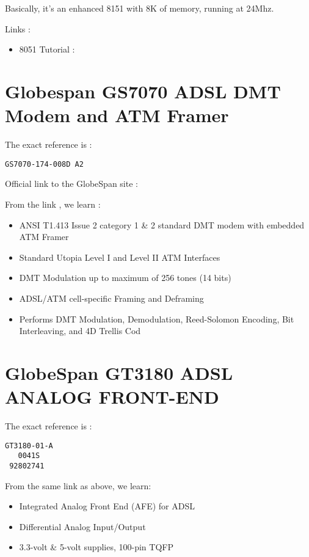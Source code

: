\documentclass[a4paper,12pt]{article}
\begin{document}
Basically, it's an enhanced 8151 with 8K of memory, running at 24Mhz.

Links :
\begin{itemize}
\item 8051 Tutorial :
\end{itemize}

\section{Globespan GS7070 ADSL DMT Modem and ATM Framer}

The exact reference is :
\begin{verbatim}
GS7070-174-008D A2
\end{verbatim}

Official link to the GlobeSpan site : 

From the link , we learn :
\begin{itemize}
\item ANSI T1.413 Issue 2 category 1 \& 2 standard DMT modem with
embedded ATM Framer
\item Standard Utopia Level I and Level II ATM Interfaces
\item DMT Modulation up to maximum of 256 tones (14 bits)
\item ADSL/ATM cell-specific Framing and Deframing
\item Performs DMT Modulation, Demodulation, Reed-Solomon Encoding,
Bit Interleaving, and 4D Trellis Cod
\end{itemize}



\section{GlobeSpan GT3180 ADSL ANALOG FRONT-END}

The exact reference is :
\begin{verbatim}
GT3180-01-A
   0041S
 92802741
\end{verbatim}

From the same link as above, we learn:
\begin{itemize}
\item Integrated Analog Front End (AFE) for ADSL
\item Differential Analog Input/Output
\item 3.3-volt \& 5-volt supplies, 100-pin TQFP
\end{itemize}
\end{document}

